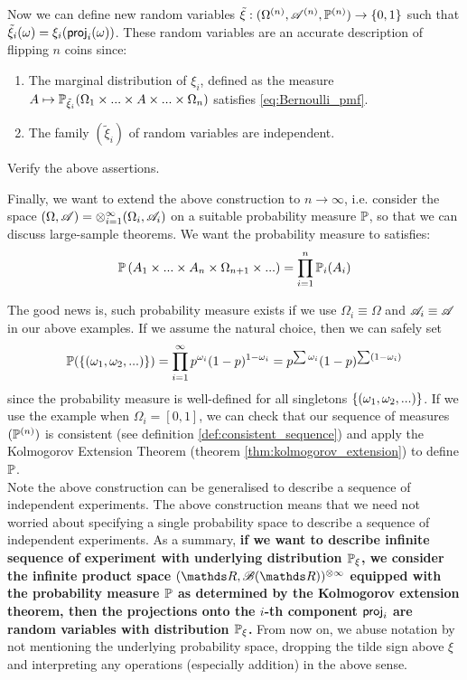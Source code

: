 Now we can define new random variables $\tilde{\xi}:(\Omega^{(n)}, \mathcal{A}^{(n)}, \mathbb{P}^{(n)}) \to \left\{ 0,1 \right \}$ such that $\tilde{\xi}_i(\omega) = \xi_i(\mathsf{proj}_i(\omega))$. These random variables are an accurate description of flipping $n$ coins since:
\begin{enumerate}
    \item The marginal distribution of $\xi_i$, defined as the measure $A \mapsto \mathbb{P}_{\tilde{\xi}_i}(\Omega_1 \times ... \times A \times ... \times \Omega_n)$ satisfies \eqref{eq:Bernoulli_pmf}.
    \item The family $(\tilde{\xi}_i)$ of random variables are independent.
\end{enumerate}

\begin{exercise}
Verify the above assertions.
\end{exercise}

Finally, we want to extend the above construction to $n \to \infty$, i.e. consider the space $(\Omega, \mathcal{A}) = \otimes_{i=1}^\infty (\Omega_i, \mathcal{A}_i)$ on a suitable probability measure $\mathbb{P}$, so that we can discuss large-sample theorems. We want the probability measure to satisfies:
\begin{equation} \label{eq:consistent_result}
    \mathbb{P}\left( A_1 \times ... \times A_n \times \Omega_{n+1} \times ... \right) = \prod_{i=1}^n \mathbb{P}_i(A_i)
\end{equation}

The good news is, such probability measure exists if we use $\Omega_i \equiv \Omega$ and $\mathcal{A}_i \equiv \mathcal{A}$ in our above examples. If we assume the natural choice, then we can safely set
\begin{equation*}
    \mathbb{P}(\left\{ (\omega_1,\omega_2,...) \right \}) = \prod_{i=1}^\infty p^{\omega_i} (1-p)^{1-\omega_i} = p^{\sum \omega_i} (1-p)^{\sum (1-\omega_i)}
\end{equation*}
since the probability measure is well-defined for all singletons $\left\{ (\omega_1,\omega_2,...) \right \}$. If we use the example when $\Omega_i = [0,1]$, we can check that our sequence of measures $(\mathbb{P}^{(n)})$ is consistent (see definition \ref{def:consistent_sequence}) and apply the Kolmogorov Extension Theorem (theorem \ref{thm:kolmogorov_extension}) to define $\mathbb{P}$.\\ 

Note the above construction can be generalised to describe a sequence of independent experiments. The above construction means that we need not worried about specifying a single probability space to describe a sequence of independent experiments. As a summary, \textbf{if we want to describe infinite sequence of experiment with underlying distribution $\mathbb{P}_\xi$, we consider the infinite product space $(\R, \B(\R))^{\otimes \infty}$ equipped with the probability measure $\mathbb{P}$ as determined by the Kolmogorov extension theorem, then the projections onto the $i$-th component $\mathsf{proj}_i$ are random variables with distribution $\mathbb{P}_\xi$.} From now on, we abuse notation by not mentioning the underlying probability space, dropping the tilde sign above $\xi$ and interpreting any operations (especially addition) in the above sense.\\

